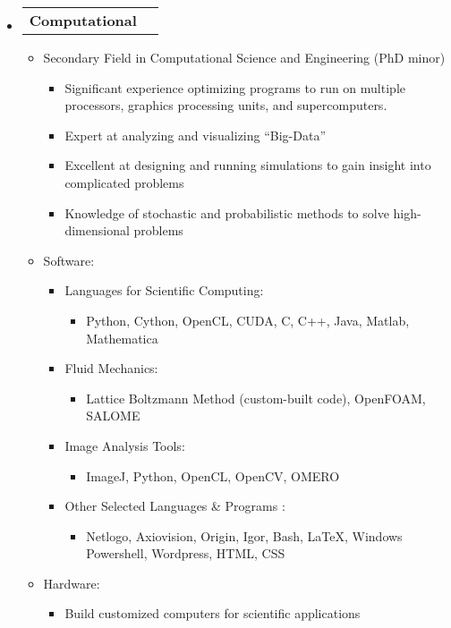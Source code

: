 \documentclass[letterpaper,11pt]{article}
\makeatletter
\newcommand{\resitem}[1]{\item #1 \vspace{-2pt}}
\newcommand{\award}[2]{\vspace{-5pt}
\begin{tabular*}{7.0in}{l@{\extracolsep{\fill}}r}
                \textbf{#1} & #2 
\end{tabular*}\vspace{-8pt}}
\makeatother
\begin{document}
\begin{itemize}

\item \award{Computational}{}

\begin{itemize}

\resitem{Secondary Field in Computational Science and Engineering (PhD minor)}
        \begin{itemize}
        \resitem{Significant experience optimizing programs to run on multiple processors, graphics processing units, and supercomputers.}
        \resitem{Expert at analyzing and visualizing ``Big-Data''}
        \resitem{Excellent at designing and running simulations to gain insight into complicated problems}
        \resitem{Knowledge of stochastic and probabilistic methods to solve high-dimensional problems}
        \end{itemize}

\resitem{Software:}

\begin{itemize}

        \resitem{Languages for Scientific Computing:} 
                \begin{itemize}
                \resitem{Python, Cython, OpenCL, CUDA, C, C++, Java, Matlab, Mathematica}
                \end{itemize}
        
        \resitem{Fluid Mechanics:}
                \begin{itemize}
                \resitem{Lattice Boltzmann Method (custom-built code), OpenFOAM, SALOME}
                \end{itemize}        
        \resitem{Image Analysis Tools:}
                \begin{itemize}
                \resitem{ImageJ, Python, OpenCL, OpenCV, OMERO}
                \end{itemize}
        
        \resitem{Other Selected Languages \& Programs}:
                \begin{itemize}
                \resitem{Netlogo, Axiovision, Origin, Igor, Bash, \LaTeX, Windows Powershell, Wordpress, HTML, CSS}
                \end{itemize}
        
\end{itemize}

\resitem{Hardware:} 
        \begin{itemize}
        \resitem{Build customized computers for scientific applications}
        \end{itemize}


\end{itemize}
\end{itemize}
\end{document}
